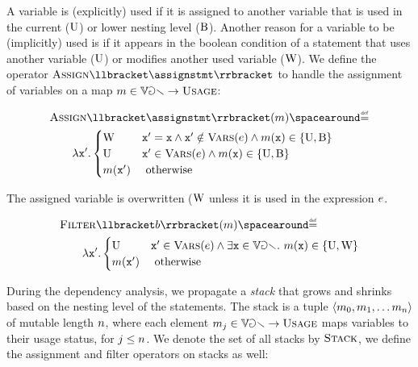 A variable is (explicitly) used if it is assigned to another variable that is used in the current ($\textup{U}$) or lower nesting level ($\textup{B}$). Another reason for a variable to be (implicitly) used is if it appears in the boolean condition of a statement that uses another variable ($\textup{U}$) or modifies another used variable ($\textup{W}$).
We define the operator $\usageassign\semanticsof{\assignstmt}$ to handle the assignment of variables on a map $m\in\mathbb{Var}\to\textsc{Usage}$:


\begin{align*}
  & \usageassign\semanticsof{\assignstmt}(\usagemap) \DefeQ \\
  &\qquad \lambda \defvariable'.
  \begin{cases}
    \overwrittentag & \defvariable' = \defvariable \land \defvariable' \notin \variablesof{\defaexp} \land \usagemap(\defvariable) \in\{ \usedtag, \belowtag\} \\
    \usedtag & \defvariable' \in \variablesof{\defaexp} \land \usagemap(\defvariable) \in \{ \usedtag, \belowtag\} \\
    \usagemap(\defvariable') & \text{ otherwise}
  \end{cases}
\end{align*}

The assigned variable is overwritten ($\textup{W}$ unless it is used in the expression $e$.

\begin{align*}
  & \usagefilter\semanticsof{\defbexp}(\usagemap) \DefeQ \\
  &\qquad \lambda \defvariable'.
  \begin{cases}
    \usedtag & \defvariable' \in \variablesof{\defaexp} \land \exists \defvariable \in \variables.\spacer \usagemap(\defvariable) \in\{ \usedtag, \overwrittentag\} \\
    \usagemap(\defvariable') & \text{ otherwise}
  \end{cases}
\end{align*}

During the dependency analysis, we propagate a \emph{stack} that grows and shrinks based on the nesting level of the statements.
The stack is a tuple $\langle m_0, m_1, \dots m_n \rangle$ of mutable length $n$, where each element $m_j\in\mathbb{Var} \to\textsc{Usage}$ maps variables to their usage status, for $j\le n$. We denote the set of all stacks by $\textsc{Stack}$, we define the assignment and filter operators on stacks as well:

